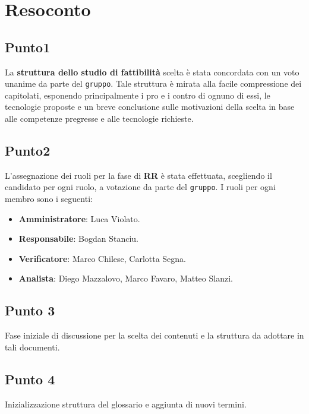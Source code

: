 \section{Resoconto}

\subsection{Punto1}

La \textbf{struttura dello studio di fattibilità} scelta è stata concordata con un voto unanime da parte del \texttt{gruppo}. Tale struttura è mirata alla facile compressione dei capitolati, esponendo principalmente i pro e i contro di ognuno di essi, le tecnologie proposte e un breve conclusione sulle motivazioni della scelta in base alle competenze pregresse e alle tecnologie richieste.  


\subsection{Punto2}
L'assegnazione dei ruoli per la fase di \textbf{RR} è stata effettuata, scegliendo il candidato per ogni ruolo, a votazione da parte del \texttt{gruppo}. I ruoli per ogni membro sono i seguenti: 
\begin{itemize}
	\item \textbf{Amministratore}: Luca Violato.
	\item \textbf{Responsabile}: Bogdan Stanciu.
	\item \textbf{Verificatore}: Marco Chilese, Carlotta Segna. 
	\item \textbf{Analista}: Diego Mazzalovo, Marco Favaro, Matteo Slanzi. 
\end{itemize}


\subsection{Punto 3}
Fase iniziale di discussione per la scelta dei contenuti e la struttura da adottare in tali documenti. 

\subsection{Punto 4}
Inizializzazione struttura del glossario e aggiunta di nuovi termini. 

